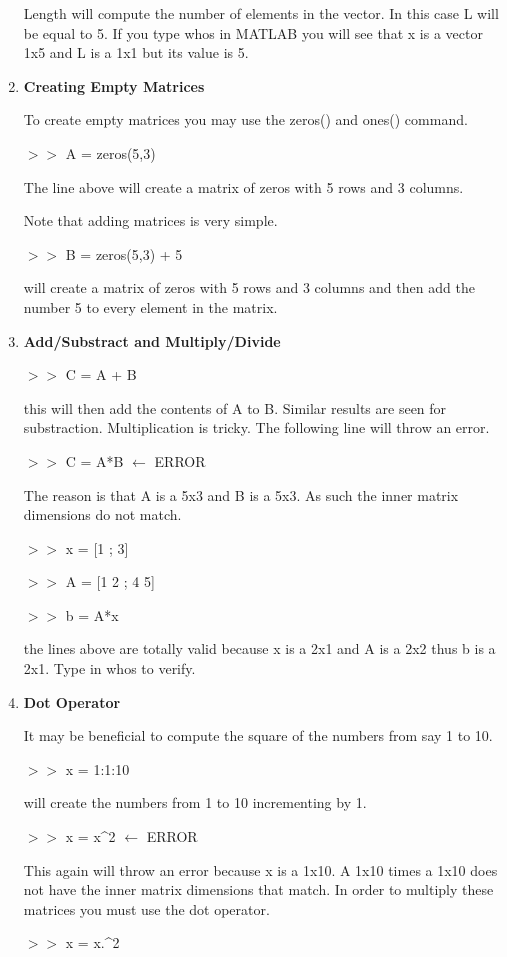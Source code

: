 \begin{enumerate}
Length will compute the number of elements in the vector. In this case
L will be equal to 5. If you type whos in MATLAB you will see that x
is a vector 1x5 and L is a 1x1 but its value is 5.

\item \textbf{ Creating Empty Matrices}

To create empty matrices you may use the zeros() and ones() command.

$>>$ A = zeros(5,3)

The line above will create a matrix of zeros with 5 rows and 3
columns. 

Note that adding matrices is very simple. 

$>>$ B = zeros(5,3) + 5

will create a matrix of zeros with 5 rows and 3 columns and then add
the number 5 to every element in the matrix.

\item \textbf{Add/Substract and Multiply/Divide}

$>>$ C = A + B

this will then add the contents of A to B. Similar results are seen
for substraction. Multiplication is tricky. The following line will
throw an error.

$>>$ C = A*B $\leftarrow$ ERROR

The reason is that A is a 5x3 and B is a 5x3. As such the inner matrix
dimensions do not match.

$>>$ x = [1 ; 3]

$>>$ A = [1 2 ; 4 5]

$>>$ b = A*x

the lines above are totally valid because x is a 2x1 and A is a 2x2
thus b is a 2x1. Type in whos to verify. 

\item \textbf{Dot Operator}

It may be beneficial to compute the square of the numbers from say 1
to 10.

$>>$ x = 1:1:10

will create the numbers from 1 to 10 incrementing by 1.

$>>$ x = x\textrm{\^}2 $\leftarrow$ ERROR

This again will throw an error because x is a 1x10. A 1x10 times a
1x10 does not have the inner matrix dimensions that match. In order to
multiply these matrices you must use the dot operator.

$>>$ x = x.\textrm{\^}2


\end{enumerate}
